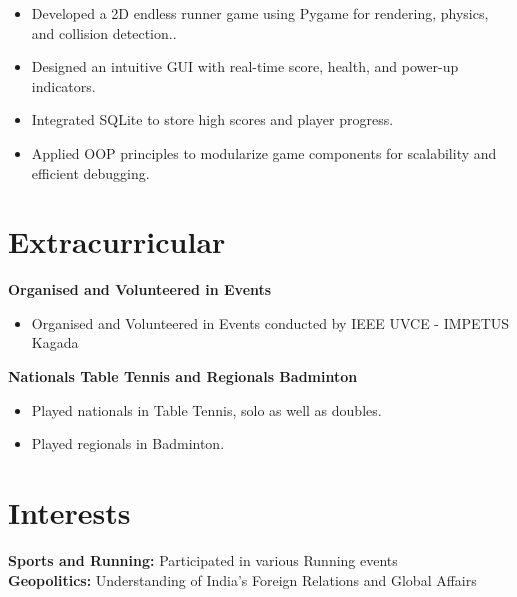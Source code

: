 \documentclass[a4paper,20pt]{article}
\begin{document}
\begin{itemize}[itemsep=0pt]
  \item Developed a 2D endless runner game using Pygame for rendering, physics, and collision detection..
\item Designed an intuitive GUI with real-time score, health, and power-up indicators.
\item Integrated SQLite to store high scores and player progress.
  \item Applied OOP principles to modularize game components for scalability and efficient debugging.
\end{itemize}
\vspace{-5pt}

\section{Extracurricular}
\vspace{1pt}
\textbf{Organised and Volunteered in Events } 
\\
\vspace{-5pt}

\begin{itemize}[itemsep=0pt]

  \item Organised and Volunteered in Events conducted by IEEE UVCE - IMPETUS Kagada
  
\end{itemize}

\textbf{Nationals Table Tennis and Regionals Badminton}
\vspace{-5pt} 

\begin{itemize}[itemsep=0pt]
  \item Played nationals in Table Tennis, solo as well as doubles.
  \item Played regionals in Badminton.
  
\end{itemize}


\section{Interests}
\vspace{1pt}

\textbf{Sports and Running: } \normalfont Participated in various Running events\\

\textbf{Geopolitics: } \normalfont Understanding of India’s Foreign Relations and Global Affairs\\

  
\end{document}

